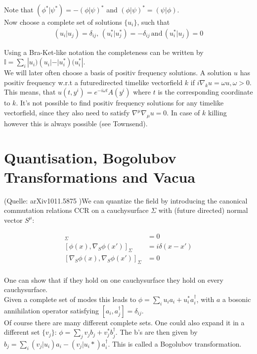 Note that \((\phi^*|\psi^*) = -(\phi|\psi)^*\) and \((\phi|\psi)^* = (\psi|\phi)\).\\

Now choose a complete set of solutions $\{u_i\}$, such that
\begin{align*}
(u_i| u_j) = \delta_{ij},\,(u_i^*| u_j^*) = -\delta_{ij}\,\text{and}\,(u_i^*| u_j) = 0
\end{align*}

Using a Bra-Ket-like notation the completeness can be written by \(\mathbb{I} = \sum_i |u_i)(u_i| - |u_i^*)(u_i^*|\).\\

We will later often choose a basis of positiv frequency solutions. A solution $u$ has positiv frequency w.r.t a futuredirected timelike vectorfield \(k\) if  \(i\nabla_k u = \omega u, \omega > 0\). This means, that \(u(t, y^i) = e^{-i\omega t} A(y^i)\) where \(t\) is the corresponding coordinate to \(k\). It's not possible to find positiv frequency solutions for any timelike vectorfield, since they also need to satisfy \(\nabla^\mu\nabla_\mu u = 0\). In case of \(k\) killing however this is always possible (see Townsend).

\section{Quantisation, Bogolubov Transformations and Vacua}

(Quelle: arXiv1011.5875 )We can quantize the field by introducing the canonical commutation relations CCR on a cauchysurface \(\Sigma\) with (future directed) normal vector $S^\mu$:

\begin{align*}
[\phi(x),\phi(x')]_\Sigma &= 0\\
[\phi(x),\nabla_S \phi(x')]_\Sigma &= i\delta(x-x')\\
[\nabla_S \phi(x),\nabla_S \phi(x')]_\Sigma &= 0\\
\end{align*}

One can show that if they hold on one cauchysurface they hold on every cauchysurface.\\
Given a complete set of modes this leads to \(\phi = \sum_i u_i a_i + u_i^* a_i^\dagger\), with \(a\) a bosonic annihilation operator satisfying \([a_i,a_j^\dagger] = \delta_{ij}\).\\

Of course there are many different complete sets. One could also expand it in a different set \(\{v_j\}\): \(\phi = \sum_j v_j b_j + v_j^* b_j^\dagger\). The b's are then given by \(b_j = \sum_i (v_j|u_i) a_i - (v_j|u_i*) a_i^\dagger\). This is called a Bogolubov transformation.\\


